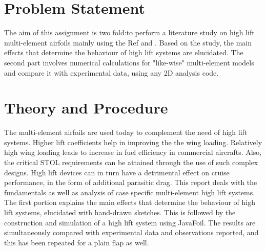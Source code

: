 \documentclass[main.tex]{subfiles}
\begin{document}
\section{Problem Statement}
The aim of this assignment is two fold:to perform a literature study on high lift multi-element airfoils mainly using the Ref\cite{highliftaero} and \cite{van2002aerodynamic}. Based on the study, the main effects that determine the behaviour of high lift systems are elucidated. The second part involves numerical calculations for "like-wise" multi-element models and compare it with experimental data, using any 2D analysis code.
\section{Theory and Procedure}
The multi-element airfoils are used today to complement the need of high lift systems. Higher lift coefficients help in improving the the wing loading. Relatively high wing loading leads to increase in fuel efficiency in commercial aircrafts. Also, the critical STOL requirements can be attained through the use of such complex designs. High lift devices can in turn have a detrimental effect on cruise performance, in the form of additional parasitic drag. This report deals with the fundamentals as well as analysis of case specific multi-element high lift systems. The first portion explains the main effects that determine the behaviour of high lift systems, elucidated with hand-drawn sketches. This is followed by the construction and simulation of a high lift system using JavaFoil. The results are simultaneously compared with experimental data and observations reported, and this has been repeated for a plain flap as well. 
\end{document}
